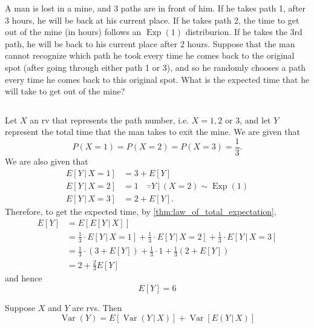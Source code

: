 \documentclass[notoc,notitlepage]{tufte-book}
\DeclareMathOperator{\Exp}{Exp }
\DeclareMathOperator{\Var}{Var }
\begin{document}
\begin{eg}
A man is lost in a mine, and 3 paths are in front of him. If he takes path 1, after 3 hours, he will be back at his current place. If he takes path 2, the time to get out of the mine (in hours) follows an $\Exp(1)$ distriburion. If he takes the 3rd path, he will be back to his current place after 2 hours. Suppose that the man cannot recognize which path he took every time he comes back to the original spot (after going through either path 1 or 3), and so he randomly chooses a path every time he comes back to this original spot. What is the expected time that he will take to get out of the mine?
\end{eg}

$ $ \\

\begin{solution}
  Let $X$ an rv that represents the path number, i.e. $X = 1, 2$ or $3$, and let $Y$ represent the total time that the man takes to exit the mine. We are given that
  \begin{equation*}
    P(X = 1) = P(X = 2) = P(X = 3) = \frac{1}{3}.
  \end{equation*}
  We are also given that
  \begin{align*}
    E[ Y \, | \, X = 1 ] &= 3 + E[Y] \\
    E[ Y \, | \, X = 2 ] &= 1 \quad \because Y \, | \, (X = 2) \sim \Exp(1) \\
    E[ Y \, | \, X = 3 ] &= 2 + E[Y].
  \end{align*}
  Therefore, to get the expected time, by \cref{thm:law_of_total_expectation},
  \begin{align*}
    E[Y] &= E[ E[ Y \, | \, X ] ] \\
      &= \frac{1}{3} \cdot E[ Y \, | \, X = 1 ] + \frac{1}{3} \cdot E[ Y \, | \, X = 2 ] + \frac{1}{3} \cdot E[ Y \, | \, X = 3 ] \\
      &= \frac{1}{3} \cdot ( 3 + E[Y] ) + \frac{1}{3} \cdot 1 + \frac{1}{3} (2 + E[Y]) \\
      &= 2 + \frac{2}{3} E[Y]
  \end{align*}
  and hence
  \begin{equation*}
    E[Y] = 6
  \end{equation*}
\end{solution}

\begin{thm}
\label{thm:law_of_total_variance}
  Suppose $X$ and $Y$ are rvs. Then
  \begin{equation*}
    \Var(Y) = E[ \Var(Y \, | \, X) ] + \Var[ E(Y \, | \, X) ]
  \end{equation*}
\end{thm}
\end{document}
